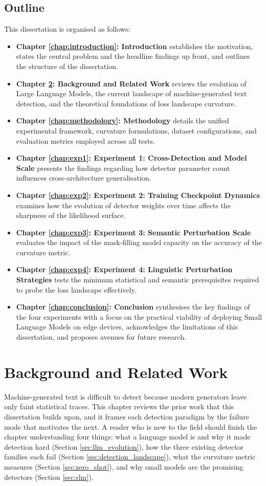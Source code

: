 \documentclass[logo,msc,cs]{infthesis}      %
\begin{document}
\section{Outline}
\label{sec:outline}
This dissertation is organised as follows:
\begin{itemize}
\item \textbf{Chapter \ref{chap:introduction}: Introduction} establishes the motivation, states the central problem and the headline findings up front, and outlines the structure of the dissertation.
\item \textbf{Chapter \ref{chap:background}: Background and Related Work} reviews the evolution of Large Language Models, the current landscape of machine-generated text detection, and the theoretical foundations of loss landscape curvature.
\item \textbf{Chapter \ref{chap:methodology}: Methodology} details the unified experimental framework, curvature formulations, dataset configurations, and evaluation metrics employed across all tests.
\item \textbf{Chapter \ref{chap:exp1}: Experiment 1: Cross-Detection and Model Scale} presents the findings regarding how detector parameter count influences cross-architecture generalisation.
\item \textbf{Chapter \ref{chap:exp2}: Experiment 2: Training Checkpoint Dynamics} examines how the evolution of detector weights over time affects the sharpness of the likelihood surface.
\item \textbf{Chapter \ref{chap:exp3}: Experiment 3: Semantic Perturbation Scale} evaluates the impact of the mask-filling model capacity on the accuracy of the curvature metric.
\item \textbf{Chapter \ref{chap:exp4}: Experiment 4: Linguistic Perturbation Strategies} tests the minimum statistical and semantic prerequisites required to probe the loss landscape effectively.
\item \textbf{Chapter \ref{chap:conclusion}: Conclusion} synthesises the key findings of the four experiments with a focus on the practical viability of deploying Small Language Models on edge devices, acknowledges the limitations of this dissertation, and proposes avenues for future research.
\end{itemize}

\chapter{Background and Related Work}
\label{chap:background}
Machine-generated text is difficult to detect because modern generators leave only faint statistical traces. This chapter reviews the prior work that this dissertation builds upon, and it frames each detection paradigm by the failure mode that motivates the next. A reader who is new to the field should finish the chapter understanding four things: what a language model is and why it made detection hard (Section \ref{sec:llm_evolution}), how the three existing detector families each fail (Section \ref{sec:detection_landscape}), what the curvature metric measures (Section \ref{sec:zero_shot}), and why small models are the promising detectors (Section \ref{sec:slm}).
\end{document}
